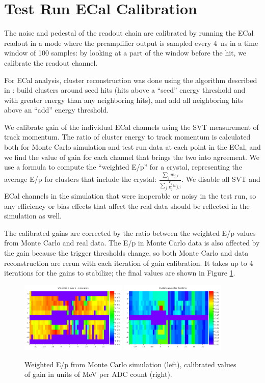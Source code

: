 \section{Test Run ECal Calibration}
\label{sec:ecal_calib}

The noise and pedestal of the readout chain are calibrated by running the ECal readout in a mode where the preamplifier output is sampled every 4~ns in a time window of 100 samples: by looking at a part of the window before the hit, we calibrate the readout channel.

For ECal analysis, cluster reconstruction was done using the algorithm described in \cite{HPS_PROP}: build clusters around seed hits (hits above a ``seed'' energy threshold and with greater energy than any neighboring hits), and add all neighboring hits above an ``add'' energy threshold.

We calibrate gain of the individual ECal channels using the SVT measurement of track momentum. 
The ratio of cluster energy to track momentum is calculated both for Monte Carlo simulation and test run data at each point in the ECal, and we find the value of gain for each channel that brings the two into agreement.
We use a formula to compute the ``weighted E/p'' for a crystal, representing the average E/p for clusters that include the crystal: $\frac{\sum_j w_{j,i}}{\sum_j\frac{P_j}{E_j}w_{j,i}}$.
We disable all SVT and ECal channels in the simulation that were inoperable or noisy in the test run, so any efficiency or bias effects that affect the real data should be reflected in the simulation as well.

The calibrated gains are corrected by the ratio between the weighted E/p values from Monte Carlo and real data.
The E/p in Monte Carlo data is also affected by the gain because the trigger thresholds change, so both Monte Carlo and data reconstruction are rerun with each iteration of gain calibration.
It takes up to 4 iterations for the gains to stabilize; the final values are shown in Figure \ref{fig:gains}.
\begin{figure}[ht]
	\includegraphics[width=0.45\textwidth]{test2012/ecalperformance/ecalgainplots_corr_sim}
	\includegraphics[width=0.45\textwidth]{test2012/ecalperformance/gains}
	\caption{\small{Weighted E/p from Monte Carlo simulation (left), calibrated values of gain in units of MeV per ADC count (right).}}
	\label{fig:gains}
\end{figure}

